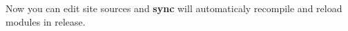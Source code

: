 \documentclass[11pt]{article}
\begin{document}

Now you can edit site sources and {\bf sync} will automaticaly recompile
and reload modules in release.







\end{document}
